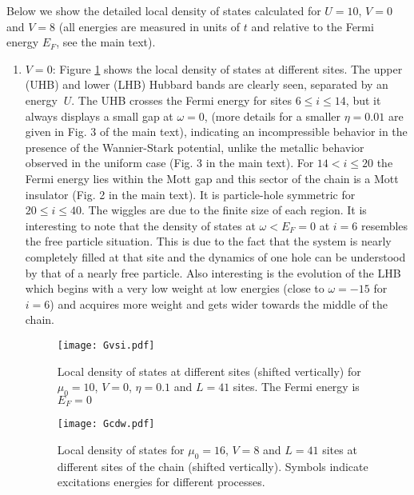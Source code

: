 \documentclass[aps,prl,showpacs,twocolumn,superscriptaddress]{revtex4-2}
\begin{document}
Below we show the detailed local density of states calculated for $U=10$, $V=0$ and $V=8$ (all energies are measured in units of $t$ and relative to the Fermi energy $E_F$, see the main text).
\begin{enumerate}
\item
$V=0$: Figure \ref{V0} shows the local density of states at different sites. The upper (UHB) and lower (LHB) Hubbard bands are clearly seen, separated by an energy $~U$. The UHB  crosses the Fermi energy for sites $6\leq i \leq 14$, but it always displays a small gap at $\omega=0$,
(more details for a smaller $\eta=0.01$ are given  in Fig. 3 of the main text), indicating
an incompressible behavior in the presence of the Wannier-Stark potential, unlike the metallic behavior observed in the uniform case
(Fig. 3 in the main text). For $14< i \leq 20$ the Fermi energy lies within the Mott gap and this sector of the chain is a Mott insulator (Fig. 2 in the main text). It is particle-hole symmetric for $20\leq i \leq 40$.
The wiggles are due to the finite size of each region. It is interesting to note that the density of states at $\omega < E_F=0$ at $i=6$ resembles the free particle situation. This is due to the fact that the system is nearly completely filled at that site and the dynamics of one hole can be understood by that of a nearly free particle. Also interesting is the evolution of the LHB which begins with a very low weight at low energies (close to $\omega=-15$ for $i=6$) and acquires more weight and gets wider towards the middle of the chain.





\begin{figure}[h]
\centering
\texttt{[image: Gvsi.pdf]}
\caption{Local density of states at different sites (shifted vertically) for $\mu^{}_0=10$, $V=0$, $\eta=0.1$ and $L=41$ sites. The Fermi energy is $E^{}_F=0$}
\label{V0}
\end{figure}






\begin{figure}[h!]
\centering
\texttt{[image: Gcdw.pdf]}
 \caption{Local density of states for $\mu^{}_0=16$, $V=8$ and $L=41$ sites at different sites of the chain (shifted vertically). Symbols indicate excitations energies for different processes. }
 \label{V4}
\end{figure}




\end{enumerate}
\end{document}
